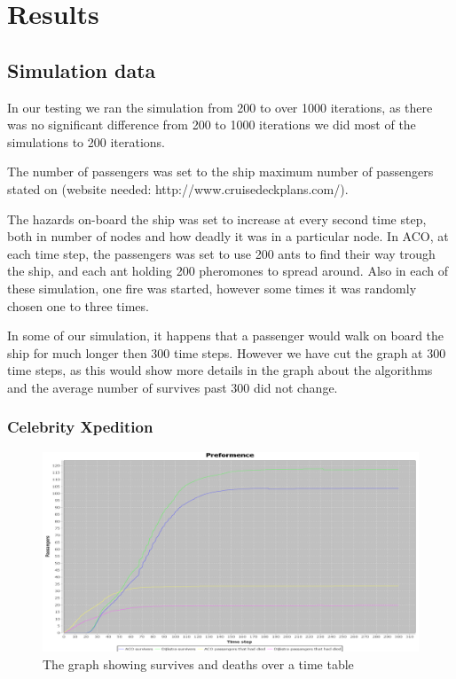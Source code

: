 \chapter{Results}
\label{ch:testing}

\section{Simulation data}
In our testing we ran the simulation from 200 to over 1000 iterations, as there was no significant difference from 200 to 1000 iterations we did most of the simulations to 200 iterations.

The number of passengers was set to the ship maximum number of passengers stated on (website needed: http://www.cruisedeckplans.com/).

The hazards on-board the ship was set to increase at every second time step, both in number of nodes and how deadly it was in a particular node. In ACO, at each time step, the passengers was set to use 200 ants to find their way trough the ship, and each ant holding 200 pheromones to spread around. Also in each of these simulation, one fire was started, however some times it was randomly chosen one to three times.

In some of our simulation, it happens that a passenger would walk on board the ship for much longer then 300 time steps. However we have cut the graph at 300 time steps, as this would show more details in the graph about the algorithms and the average number of survives past 300 did not change.


\subsection{Celebrity Xpedition}

\begin{figure} [h]
\centering
\hspace*{-5.5in}
\includegraphics[scale=0.35]{images/Graph using 200 rounds 140 passangers and shortest first one hazzard.png}
\caption{The graph showing survives and deaths over a time table}
\label{fig:celebSafty}
\end{figure}

